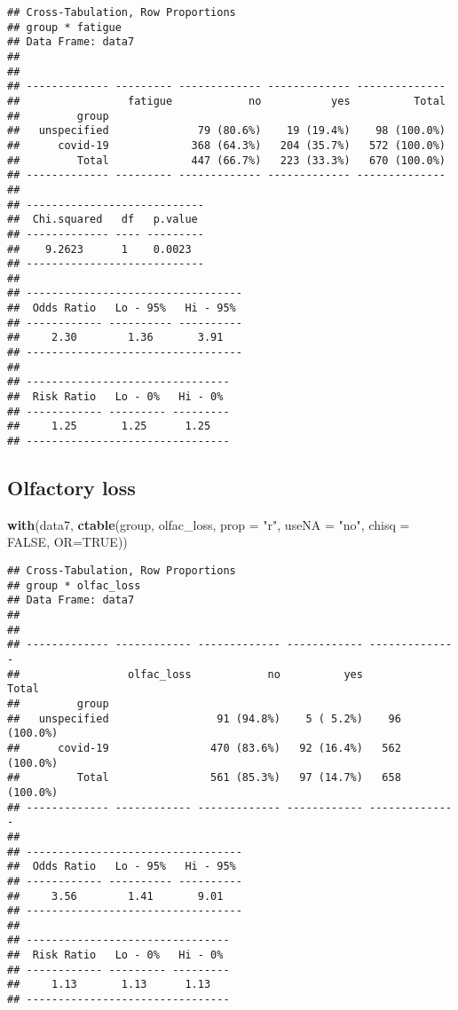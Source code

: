 \documentclass[
]{article}
\newenvironment{Shaded}{\begin{snugshade}}{\end{snugshade}}
\newcommand{\DataTypeTok}[1]{\textcolor[rgb]{0.13,0.29,0.53}{#1}}
\newcommand{\KeywordTok}[1]{\textcolor[rgb]{0.13,0.29,0.53}{\textbf{#1}}}
\newcommand{\NormalTok}[1]{#1}
\newcommand{\OtherTok}[1]{\textcolor[rgb]{0.56,0.35,0.01}{#1}}
\newcommand{\StringTok}[1]{\textcolor[rgb]{0.31,0.60,0.02}{#1}}
\begin{document}
\begin{verbatim}
## Cross-Tabulation, Row Proportions  
## group * fatigue  
## Data Frame: data7  
## 
## 
## ------------- --------- ------------- ------------- --------------
##                 fatigue            no           yes          Total
##         group                                                     
##   unspecified              79 (80.6%)    19 (19.4%)    98 (100.0%)
##      covid-19             368 (64.3%)   204 (35.7%)   572 (100.0%)
##         Total             447 (66.7%)   223 (33.3%)   670 (100.0%)
## ------------- --------- ------------- ------------- --------------
## 
## ----------------------------
##  Chi.squared   df   p.value 
## ------------- ---- ---------
##    9.2623      1    0.0023  
## ----------------------------
## 
## ----------------------------------
##  Odds Ratio   Lo - 95%   Hi - 95% 
## ------------ ---------- ----------
##     2.30        1.36       3.91   
## ----------------------------------
## 
## --------------------------------
##  Risk Ratio   Lo - 0%   Hi - 0% 
## ------------ --------- ---------
##     1.25       1.25      1.25   
## --------------------------------
\end{verbatim}

\hypertarget{olfactory-loss}{%
\subsection{Olfactory loss}\label{olfactory-loss}}

\begin{Shaded}
\begin{Highlighting}[]
\KeywordTok{with}\NormalTok{(data7, }\KeywordTok{ctable}\NormalTok{(group, olfac_loss, }\DataTypeTok{prop =} \StringTok{"r"}\NormalTok{, }\DataTypeTok{useNA =} \StringTok{"no"}\NormalTok{, }\DataTypeTok{chisq =} \OtherTok{FALSE}\NormalTok{, }\DataTypeTok{OR=}\OtherTok{TRUE}\NormalTok{))}
\end{Highlighting}
\end{Shaded}

\begin{verbatim}
## Cross-Tabulation, Row Proportions  
## group * olfac_loss  
## Data Frame: data7  
## 
## 
## ------------- ------------ ------------- ------------ --------------
##                 olfac_loss            no          yes          Total
##         group                                                       
##   unspecified                 91 (94.8%)    5 ( 5.2%)    96 (100.0%)
##      covid-19                470 (83.6%)   92 (16.4%)   562 (100.0%)
##         Total                561 (85.3%)   97 (14.7%)   658 (100.0%)
## ------------- ------------ ------------- ------------ --------------
## 
## ----------------------------------
##  Odds Ratio   Lo - 95%   Hi - 95% 
## ------------ ---------- ----------
##     3.56        1.41       9.01   
## ----------------------------------
## 
## --------------------------------
##  Risk Ratio   Lo - 0%   Hi - 0% 
## ------------ --------- ---------
##     1.13       1.13      1.13   
## --------------------------------
\end{verbatim}
\end{document}
